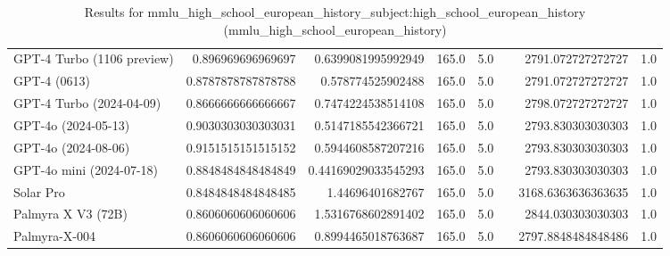 \begin{table}[htp]
{\begin{tabular}{lrrrrrrr}
GPT-4 Turbo (1106 preview) & 0.896969696969697 & 0.6399081995992949 & 165.0 & 5.0 &  & 2791.072727272727 & 1.0 \\
GPT-4 (0613) & 0.8787878787878788 & 0.578774525902488 & 165.0 & 5.0 &  & 2791.072727272727 & 1.0 \\
GPT-4 Turbo (2024-04-09) & 0.8666666666666667 & 0.7474224538514108 & 165.0 & 5.0 &  & 2798.072727272727 & 1.0 \\
GPT-4o (2024-05-13) & 0.9030303030303031 & 0.5147185542366721 & 165.0 & 5.0 &  & 2793.830303030303 & 1.0 \\
GPT-4o (2024-08-06) & 0.9151515151515152 & 0.5944608587207216 & 165.0 & 5.0 &  & 2793.830303030303 & 1.0 \\
GPT-4o mini (2024-07-18) & 0.8848484848484849 & 0.44169029033545293 & 165.0 & 5.0 &  & 2793.830303030303 & 1.0 \\
Solar Pro & 0.8484848484848485 & 1.44696401682767 & 165.0 & 5.0 &  & 3168.6363636363635 & 1.0 \\
Palmyra X V3 (72B) & 0.8606060606060606 & 1.5316768602891402 & 165.0 & 5.0 &  & 2844.030303030303 & 1.0 \\
Palmyra-X-004 & 0.8606060606060606 & 0.8994465018763687 & 165.0 & 5.0 &  & 2797.8848484848486 & 1.0 \\
\bottomrule
\end{tabular}}
\caption{Results for mmlu_high_school_european_history_subject:high_school_european_history (mmlu_high_school_european_history)}
\label{fig:mmlu_high_school_european_history_subject:high_school_european_history (mmlu_high_school_european_history)}
\end{table}